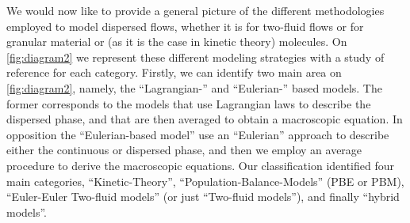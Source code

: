 We would now like to provide a general picture of the different methodologies employed to model dispersed flows, whether it is for two-fluid flows or for granular material or (as it is the case in kinetic theory) molecules. 
On \ref{fig:diagram2} we represent these different modeling strategies with a study of reference for each category. 
Firstly, we can identify two main area on \ref{fig:diagram2}, namely, the ``Lagrangian-'' and ``Eulerian-'' based models. 
The former corresponds to the models that use Lagrangian laws to describe the dispersed phase, and that are then averaged to obtain a macroscopic equation. 
In opposition the ``Eulerian-based model'' use an ``Eulerian'' approach to describe either the continuous or dispersed phase, and then we employ an average procedure to derive the macroscopic equations. 
Our classification identified four main categories, ``Kinetic-Theory'', ``Population-Balance-Models'' (PBE or PBM), ``Euler-Euler Two-fluid models'' (or just ``Two-fluid models''), and finally ``hybrid models''. 
